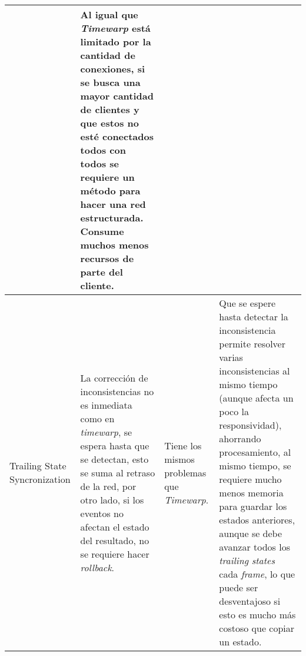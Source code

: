 \begin{longtable}{|p{2cm}|p{4cm}|p{4cm}|p{4cm}|}
&
Al igual que \emph{Timewarp} está limitado por la cantidad de conexiones, si se busca una mayor cantidad de clientes y que estos no esté conectados todos con todos se requiere un método para hacer una red estructurada.
\newline Consume muchos menos recursos de parte del cliente.
\\ \hline
Trailing State Syncronization
&
La corrección de inconsistencias no es inmediata como en \emph{timewarp}, se espera hasta que se detectan, esto se suma al retraso de la red, por otro lado, si los eventos no afectan el estado del resultado, no se requiere hacer \emph{rollback}.
&
Tiene los mismos problemas que \emph{Timewarp}.
&
Que se espere hasta detectar la inconsistencia permite resolver varias inconsistencias al mismo tiempo (aunque afecta un poco la responsividad), ahorrando procesamiento, al mismo tiempo, se requiere mucho menos memoria para guardar los estados anteriores, aunque se debe avanzar todos los \emph{trailing states} cada \emph{frame}, lo que puede ser desventajoso si esto es mucho más costoso que copiar un estado.
\\ \hline
\end{longtable}
\normalsize





